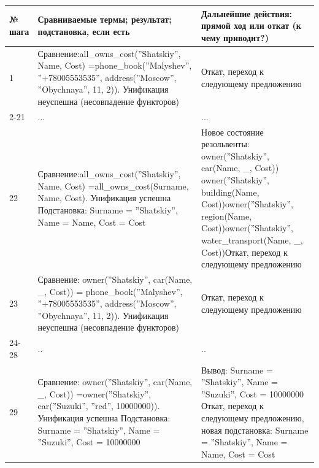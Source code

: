 \documentclass[12pt]{report}
\begin{document}
\begin{table}[H]
	\begin{center}
		\begin{tabular}{|p{1 cm}|p{10 cm}|p{8 cm}|}
			\hline
			№ шага & Сравниваемые термы; результат; подстановка, если есть & Дальнейшие действия: прямой ход или откат (к чему приводит?) \\
			\hline 
			1 & Сравнение:\newline all\_owns\_cost(''Shatskiy'', Name, Cost) =\newline phone\_book(''Malyshev'', ''+78005553535'', address(''Moscow'', ''Obychnaya'', 11, 2)). \newline Унификация неуспешна (несовпадение функторов) & Откат, переход к следующему предложению \\
			\hline
			2-21 & ... & ... \\
			\hline
			22 & Сравнение:\newline all\_owns\_cost(''Shatskiy'', Name, Cost) =\newline all\_owns\_cost(Surname, Name, Cost). \newline Унификация успешна \newline Подстановка: {Surname = ''Shatskiy'', Name = Name, Cost = Cost} & Новое состояние резольвенты: \newline owner(''Shatskiy'', car(Name, \_, Cost)) \newline owner(''Shatskiy'', building(Name, Cost))\newline owner(''Shatskiy'', region(Name, Cost))\newline owner(''Shatskiy'', water\_transport(Name, \_, Cost))\newline Откат, переход к следующему предложению \\
			\hline
			23 & Сравнение: \newline owner(''Shatskiy'', car(Name, \_, Cost)) = \newline phone\_book(''Malyshev'', ''+78005553535'', address(''Moscow'', ''Obychnaya'', 11, 2)). \newline Унификация неуспешна (несовпадение функторов) & Откат, переход к следующему предложению \\
			\hline
			24-28 & .. & .. \\
			\hline
			29 & Сравнение: \newline owner(''Shatskiy'', car(Name, \_, Cost)) =\newline owner(''Shatskiy'', car(''Suzuki'', ''red'', 10000000)). \newline Унификация успешна \newline Подстановка: {Surname = ''Shatskiy'', Name = ''Suzuki'', Cost = 10000000} & Вывод: Surname = ''Shatskiy'', Name = ''Suzuki'', Cost = 10000000 \newline Откат, переход к следующему предложению, новая подстановка: {Surname = ''Shatskiy'', Name = Name, Cost = Cost} \\

\end{tabular}
\end{center}
\end{table}
\end{document}
